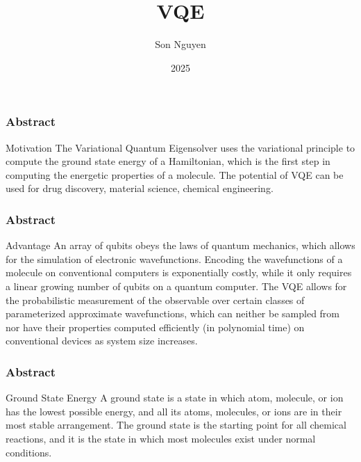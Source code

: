 \documentclass{beamer}
\title{VQE}
\author{Son Nguyen}
\institute{Stevens Institute of Technology}
\date{2025}
\begin{document}
\frame{\titlepage}
\begin{frame}
    \frametitle{Abstract}
    \begin{block}{Motivation}
        The Variational Quantum Eigensolver uses the variational principle to
         compute the ground state energy of a Hamiltonian, which is the first step in computing 
         the energetic properties of a molecule. The potential of VQE can be used for drug discovery,
         material science, chemical engineering.
    \end{block}
\end{frame}
\begin{frame}
    \frametitle{Abstract}
    \begin{block}{Advantage}
        An array of qubits obeys the laws of quantum mechanics, which allows for the simulation of electronic
         wavefunctions. Encoding the wavefunctions of a molecule on conventional computers is exponentially costly, while it only
         requires a linear growing number of qubits on a quantum computer. The VQE allows for the probabilistic measurement of the observable
         over certain classes of parameterized approximate wavefunctions, which can neither be sampled from nor have their properties computed efficiently (in polynomial time) on conventional devices
         as system size increases.
    \end{block}
\end{frame}

\begin{frame}
    \frametitle{Abstract}
    \begin{block}{Ground State Energy}
        A ground state is a state in which atom, molecule, or ion has the lowest possible energy, and all its atoms, molecules, or ions are in their most stable arrangement.
        The ground state is the starting point for all chemical reactions, and it is the state in which most molecules exist under normal conditions. 
    \end{block}
\end{frame}
\end{document}
